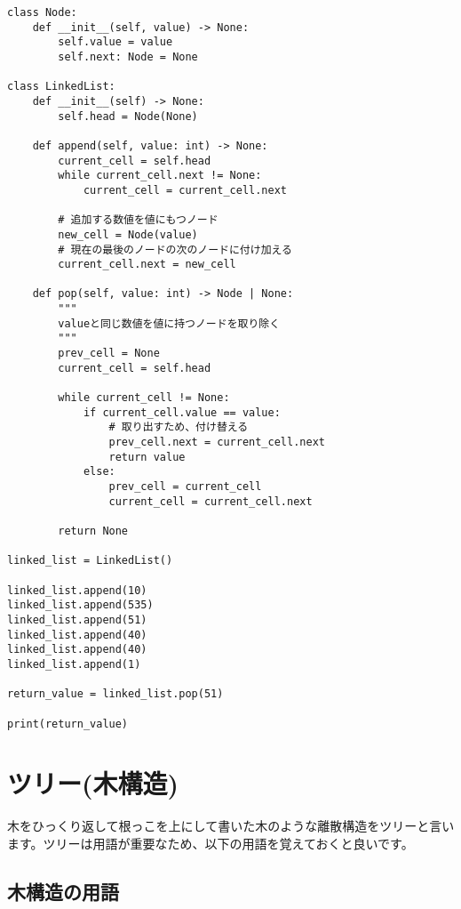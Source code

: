 \begin{lstlisting}[caption=線形リストの実装, label=linear, frame=TRBL, label={linear}]
class Node:
    def __init__(self, value) -> None:
        self.value = value
        self.next: Node = None
        
class LinkedList:
    def __init__(self) -> None:
        self.head = Node(None)
    
    def append(self, value: int) -> None:
        current_cell = self.head
        while current_cell.next != None:
            current_cell = current_cell.next
        
        # 追加する数値を値にもつノード
        new_cell = Node(value)
        # 現在の最後のノードの次のノードに付け加える
        current_cell.next = new_cell
        
    def pop(self, value: int) -> Node | None:
        """
        valueと同じ数値を値に持つノードを取り除く
        """
        prev_cell = None
        current_cell = self.head
        
        while current_cell != None:
            if current_cell.value == value:
                # 取り出すため、付け替える
                prev_cell.next = current_cell.next
                return value
            else:
                prev_cell = current_cell
                current_cell = current_cell.next
        
        return None

linked_list = LinkedList()

linked_list.append(10)
linked_list.append(535)
linked_list.append(51)
linked_list.append(40)
linked_list.append(40)
linked_list.append(1)

return_value = linked_list.pop(51)

print(return_value)

\end{lstlisting}

\newpage

\section{ツリー(木構造)}
木をひっくり返して根っこを上にして書いた木のような離散構造をツリーと言います。ツリーは用語が重要なため、以下の用語を覚えておくと良いです。

\subsection{木構造の用語}

